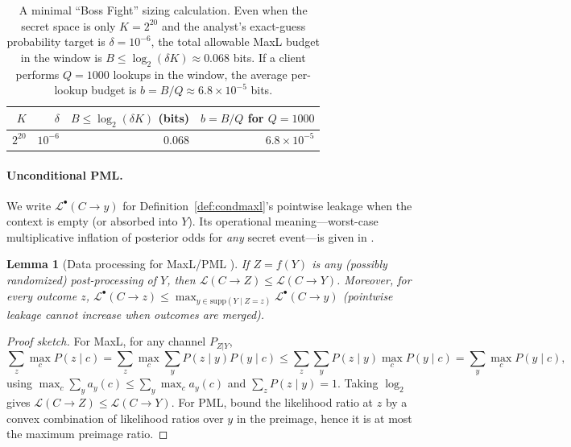 \documentclass[11pt]{article}
\newcommand{\supp}{\mathrm{supp}}
\newcommand{\MaxL}{\mathcal{L}}
\newcommand{\PML}{\mathcal{L}^{\bullet}}
\newcommand{\logtwo}{\log_2}
\newtheorem{lemma}{Lemma}
\begin{document}
\begin{table}[t]
\centering
\caption{A minimal ``Boss Fight'' sizing calculation. Even when the secret space is only $K=2^{20}$ and the analyst's exact-guess probability target is $\delta=10^{-6}$, the total allowable MaxL budget in the window is $B\le \logtwo(\delta K)\approx 0.068$ bits. If a client performs $Q=1000$ lookups in the window, the average per-lookup budget is $b=B/Q\approx 6.8\times 10^{-5}$ bits.}
\label{tab:window-example}
\begin{tabular}{rrrr}
\toprule
$K$ & $\delta$ & $B\le \logtwo(\delta K)$ (bits) & $b=B/Q$ for $Q{=}1000$ \\
\midrule
$2^{20}$ & $10^{-6}$ & $0.068$ & $6.8\times 10^{-5}$ \\
\bottomrule
\end{tabular}
\end{table}




\paragraph{Unconditional PML.}
We write $\PML(C\!\to\!y)$ for Definition~\ref{def:condmaxl}'s pointwise leakage when the context is empty (or absorbed into $Y$). Its operational meaning---worst-case multiplicative inflation of posterior odds for \emph{any} secret event---is given in \cite{saeidian2023pml,saeidian2025rethinking}.

\begin{lemma}[Data processing for MaxL/PML \cite{issa2020operational,saeidian2023pml}]\label{lem:dp}
If $Z=f(Y)$ is any (possibly randomized) post-processing of $Y$, then
$\MaxL(C\!\to\!Z)\le \MaxL(C\!\to\!Y)$.
Moreover, for every outcome $z$, $\PML(C\!\to\!z)\le \max_{y\in\supp(Y\mid Z=z)} \PML(C\!\to\!y)$ (pointwise leakage cannot increase when outcomes are merged).
\end{lemma}

\begin{proof}[Proof sketch]
For MaxL, for any channel $P_{Z|Y}$,
\[
\sum_z \max_c P(z\mid c)
=\sum_z \max_c \sum_y P(z\mid y)P(y\mid c)
\le \sum_z \sum_y P(z\mid y)\max_c P(y\mid c)
= \sum_y \max_c P(y\mid c),
\]
using $\max_c\sum_y a_y(c)\le \sum_y \max_c a_y(c)$ and $\sum_z P(z\mid y)=1$.
Taking $\logtwo$ gives $\MaxL(C\!\to\!Z)\le \MaxL(C\!\to\!Y)$.
For PML, bound the likelihood ratio at $z$ by a convex combination of likelihood ratios over $y$ in the preimage, hence it is at most the maximum preimage ratio.
\end{proof}
\end{document}
